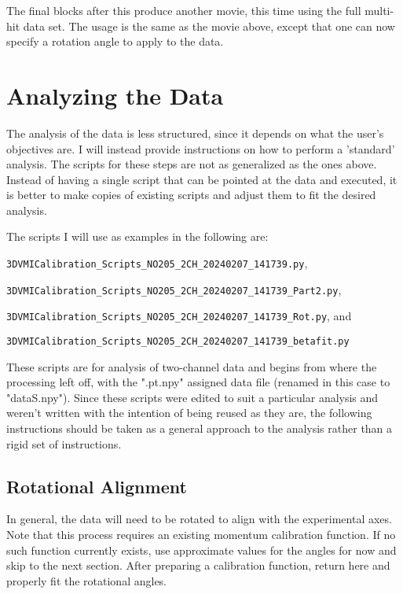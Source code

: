 \documentclass[12pt]{article}
\begin{document}
The final blocks after this produce another movie, this time using the full multi-hit data set.
The usage is the same as the movie above, except that one can now specify a rotation angle to apply to the data.

\section{Analyzing the Data}

The analysis of the data is less structured, since it depends on what the user's objectives are.
I will instead provide instructions on how to perform a 'standard' analysis.
The scripts for these steps are not as generalized as the ones above.
Instead of having a single script that can be pointed at the data and executed, it is better to make copies of existing scripts and adjust them to fit the desired analysis.

The scripts I will use as examples in the following are:

\noindent
\texttt{3DVMICalibration\_Scripts\_NO205\_2CH\_20240207\_141739.py},

\noindent
\texttt{3DVMICalibration\_Scripts\_NO205\_2CH\_20240207\_141739\_Part2.py}, 

\noindent
\texttt{3DVMICalibration\_Scripts\_NO205\_2CH\_20240207\_141739\_Rot.py}, and 

\noindent
\texttt{3DVMICalibration\_Scripts\_NO205\_2CH\_20240207\_141739\_betafit.py}

These scripts are for analysis of two-channel data and begins from where the processing left off, with the ".pt.npy" assigned data file (renamed in this case to "dataS.npy").
Since these scripts were edited to suit a particular analysis and weren't written with the intention of being reused as they are, the following instructions should be taken as a general approach to the analysis rather than a rigid set of instructions.

\subsection{Rotational Alignment}

In general, the data will need to be rotated to align with the experimental axes.
Note that this process requires an existing momentum calibration function.
If no such function currently exists, use approximate values for the angles for now and skip to the next section.
After preparing a calibration function, return here and properly fit the rotational angles.
\end{document}
